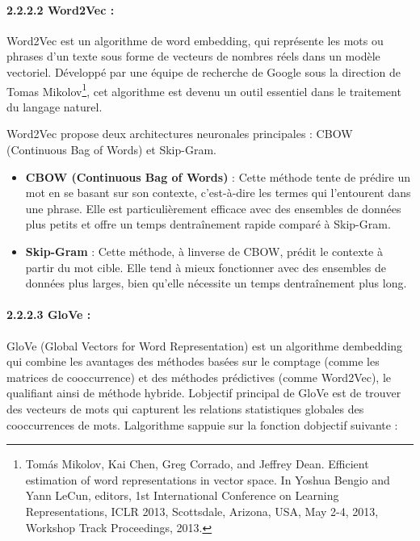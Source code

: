 \documentclass[
]{article}
\begin{document}
\paragraph{2.2.2.2 Word2Vec :}\label{word2vec}

Word2Vec est un algorithme de word embedding, qui représente les mots ou
phrases d'un texte sous forme de vecteurs de nombres réels dans un
modèle vectoriel. Développé par une équipe de recherche de Google sous
la direction de Tomas Mikolov\footnote{Tomás Mikolov, Kai Chen, Greg
  Corrado, and Jeffrey Dean. Efficient estimation of word
  representations in vector space. In Yoshua Bengio and Yann LeCun,
  editors, 1st International Conference on Learning Representations,
  ICLR 2013, Scottsdale, Arizona, USA, May 2-4, 2013, Workshop Track
  Proceedings, 2013.}, cet algorithme est devenu un outil essentiel dans
le traitement du langage naturel.

Word2Vec propose deux architectures neuronales principales : CBOW
(Continuous Bag of Words) et Skip-Gram.

\begin{itemize}
\item
  \textbf{CBOW (Continuous Bag of Words)} : Cette méthode tente de
  prédire un mot en se basant sur son contexte, c'est-à-dire les termes
  qui l'entourent dans une phrase. Elle est particulièrement efficace
  avec des ensembles de données plus petits et offre un temps
  d\textquotesingle entraînement rapide comparé à Skip-Gram.
\item
  \textbf{Skip-Gram} : Cette méthode, à l\textquotesingle inverse de
  CBOW, prédit le contexte à partir du mot cible. Elle tend à mieux
  fonctionner avec des ensembles de données plus larges, bien qu'elle
  nécessite un temps d\textquotesingle entraînement plus long.
\end{itemize}

\paragraph{2.2.2.3 GloVe :}\label{glove}

GloVe (Global Vectors for Word Representation) est un algorithme
d\textquotesingle embedding qui combine les avantages des méthodes
basées sur le comptage (comme les matrices de cooccurrence) et des
méthodes prédictives (comme Word2Vec), le qualifiant ainsi de méthode
hybride. L\textquotesingle objectif principal de GloVe est de trouver
des vecteurs de mots qui capturent les relations statistiques globales
des cooccurrences de mots. L\textquotesingle algorithme
s\textquotesingle appuie sur la fonction d\textquotesingle objectif
suivante :
\end{document}
